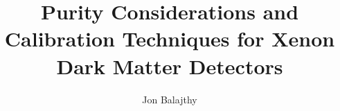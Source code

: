 \documentclass[letterpaper,12pt]{umd-thesis}
\title{Purity Considerations and Calibration Techniques for Xenon Dark Matter Detectors}
\author{Jon Balajthy}
\numberwithin{equation}{chapter}
\numberwithin{thm}{chapter}
\numberwithin{lem}{chapter}
\numberwithin{cor}{chapter}
\numberwithin{definition}{chapter}
\begin{document}
\begin{abstract}

\end{abstract} 

\begin{preliminary}

    \begin{preface}
        \lipsum[1]
    \end{preface}

    \begin{foreword}
        \lipsum[1]
    \end{foreword}


	\begin{dedication}
		
	\end{dedication}

	\begin{acknowledgements}	
		
	\end{acknowledgements}
\end{preliminary}








\end{document}
